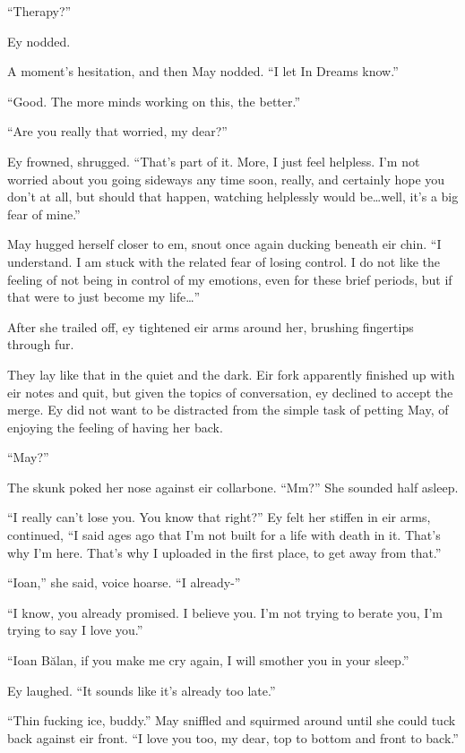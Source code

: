 ``Therapy?''

Ey nodded.

A moment's hesitation, and then May nodded. ``I let In Dreams know.''

``Good. The more minds working on this, the better.''

``Are you really that worried, my dear?''

Ey frowned, shrugged. ``That's part of it. More, I just feel helpless. I'm not worried about you going sideways any time soon, really, and certainly hope you don't at all, but should that happen, watching helplessly would be\ldots well, it's a big fear of mine.''

May hugged herself closer to em, snout once again ducking beneath eir chin. ``I understand. I am stuck with the related fear of losing control. I do not like the feeling of not being in control of my emotions, even for these brief periods, but if that were to just become my life\ldots{}''

After she trailed off, ey tightened eir arms around her, brushing fingertips through fur.

They lay like that in the quiet and the dark. Eir fork apparently finished up with eir notes and quit, but given the topics of conversation, ey declined to accept the merge. Ey did not want to be distracted from the simple task of petting May, of enjoying the feeling of having her back.

``May?''

The skunk poked her nose against eir collarbone. ``Mm?'' She sounded half asleep.

``I really can't lose you. You know that right?'' Ey felt her stiffen in eir arms, continued, ``I said ages ago that I'm not built for a life with death in it. That's why I'm here. That's why I uploaded in the first place, to get away from that.''

``Ioan,'' she said, voice hoarse. ``I already-''

``I know, you already promised. I believe you. I'm not trying to berate you, I'm trying to say I love you.''

``Ioan Bălan, if you make me cry again, I will smother you in your sleep.''

Ey laughed. ``It sounds like it's already too late.''

``Thin fucking ice, buddy.'' May sniffled and squirmed around until she could tuck back against eir front. ``I love you too, my dear, top to bottom and front to back.''

